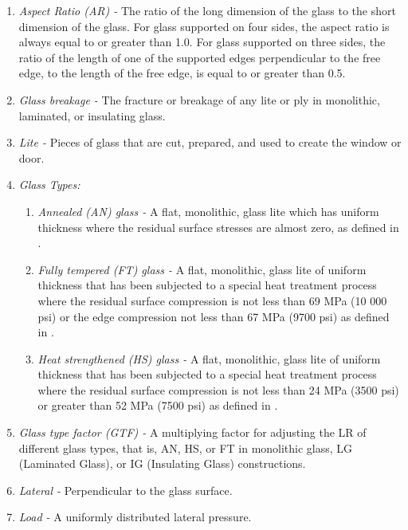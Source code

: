 \documentclass[12pt]{article}
\begin{document}
\begin{enumerate}
\item \textit{Aspect Ratio (AR) -} The ratio of the long dimension of the
  glass to the short dimension of the glass.  For glass supported on four sides,
  the aspect ratio is always equal to or greater than 1.0. For glass supported
  on three sides, the ratio of the length of one of the supported edges
  perpendicular to the free edge, to the length of the free edge, is equal to or
  greater than 0.5.

\item \textit{Glass breakage -} The fracture or breakage of any lite or ply in
  monolithic, laminated, or insulating glass.
    \item \textit{Lite -} Pieces of glass that are cut, prepared, and used to create the window or door. 
\item \textit{Glass Types:}
\begin{enumerate}
\item \textit{Annealed (AN) glass -} A flat, monolithic, glass lite which has uniform 
thickness where the residual surface stresses are almost zero, as defined in 
\cite{ASTM2016}.
\item \textit{Fully tempered (FT) glass -} A flat, monolithic, glass lite of 
uniform thickness that has been subjected to a special heat treatment process 
where the residual surface compression is not less than 69 MPa (10 000 psi) or 
the edge compression not less than 67 MPa (9700 psi) as defined in \cite{ASTM2012a}.

\item \textit{Heat strengthened (HS) glass -} A flat, monolithic, glass lite of 
uniform thickness that has been subjected to a special heat treatment process 
where the residual surface compression is not less than 24 MPa (3500 psi) or 
greater than 52 MPa (7500 psi) as defined in \cite{ASTM2012a}.

\end{enumerate}
  
\item \textit{Glass type factor (GTF) -} A multiplying factor for adjusting the 
LR of different glass types, that is, AN, HS, or FT in monolithic glass, LG
(Laminated Glass), or IG (Insulating Glass) constructions.
\item \textit{Lateral -} Perpendicular to the glass surface.
\item \textit{Load -} A uniformly distributed lateral pressure.


\end{enumerate}
\end{document}
